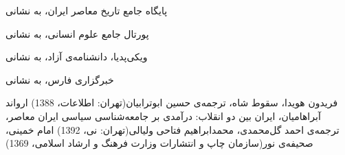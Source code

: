 \documentclass{article}
\begin{document}
\begin{thebibliography}{9}

\bibitem{}
پایگاه جامع تاریخ معاصر ایران، به نشانی

\bibitem{}
پورتال جامع علوم انسانی، به نشانی 

\bibitem{}
ویکی‌پدیا، دانشنامه‌ی آزاد، به نشانی

\bibitem{}
خبرگزاری فارس، به نشانی

\bibitem{}
فریدون هویدا، سقوط شاه، ترجمه‌ی حسین ابوترابیان(تهران: اطلاعات، 1388)
\bibitem{}
ارواند آبراهامیان، ایران بین دو انقلاب: درآمدی بر جامعه‌شناسی سیاسی ایران معاصر، ترجمه‌ی احمد گل‌محمدی، محمدابراهیم فتاحی ولیالی(تهران: نی، 1392)
\bibitem{}
امام خمینی، صحیفه‌ی نور(سازمان چاپ و انتشارات وزارت فرهنگ و ارشاد اسلامی، 1369)

\end{thebibliography}
\end{document}
